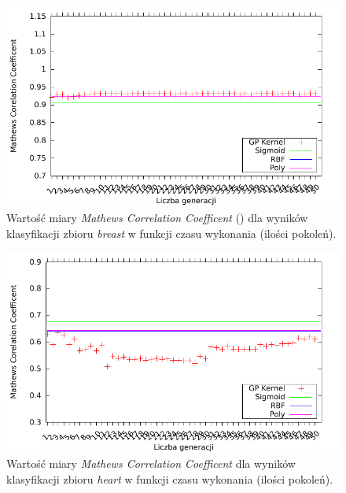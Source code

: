 	\begin{figure}
		\includegraphics[scale=0.90]{figures/results/mcc/mcc-breast}
		\caption{Wartość miary \emph{Mathews Correlation Coefficent} () dla wyników klasyfikacji zbioru \emph{breast} w funkcji czasu wykonania (ilości pokoleń).\label{fig:mcc-breast}}
	\end{figure}
	
	\begin{figure}
		\includegraphics[scale=0.90]{figures/results/mcc/mcc-heart}
		\caption{Wartość miary \emph{Mathews Correlation Coefficent} dla wyników klasyfikacji zbioru \emph{heart} w funkcji czasu wykonania (ilości pokoleń).\label{fig:mcc-heart}}
	\end{figure}
	
